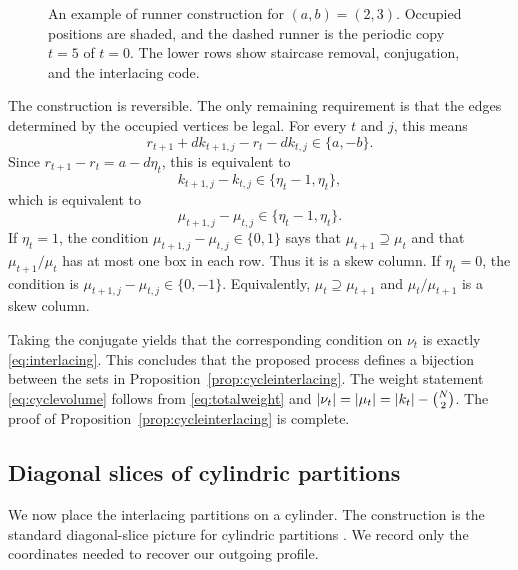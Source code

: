 \documentclass[12pt,reqno]{amsart}
\numberwithin{equation}{section}
\theoremstyle{definition}
\theoremstyle{remark}
\theoremstyle{plain}
\DeclarePairedDelimiter\abs{\lvert}{\rvert}
\begin{document}
\begin{figure}[!htbp]
\caption{An example of runner construction for $(a,b)=(2,3)$. Occupied positions are shaded, and the dashed runner is the periodic copy $t=5$ of $t=0$.  The lower rows show staircase removal, conjugation, and the interlacing code. }
\label{fig:residuerunners}
\end{figure}


The construction is reversible. The only remaining requirement is that the edges determined by the occupied vertices be legal. For every $t$ and $j$, this means
\[r_{t+1}+dk_{t+1,j}-r_t-dk_{t,j} \in \{a,-b\}.\]
Since $r_{t+1}-r_t=a-d\eta_t$, this is equivalent to
\begin{equation}\label{eq:runnerdiff}
 k_{t+1,j}-k_{t,j}\in\{\eta_t-1,\eta_t\},
\end{equation}
which is equivalent to
\[ \mu_{t+1,j}-\mu_{t,j}\in \{\eta_t-1,\eta_t\}.\]
If $\eta_t=1$, the condition $\mu_{t+1,j}-\mu_{t,j}\in\{0,1\}$ says that $\mu_{t+1}\supseteq\mu_t$ and that $\mu_{t+1}/\mu_t$ has at most one box in each row. Thus it is a skew column. If $\eta_t=0$, the condition is $\mu_{t+1,j}-\mu_{t,j}\in\{0,-1\}$. Equivalently, $\mu_t\supseteq\mu_{t+1}$ and $\mu_t/\mu_{t+1}$ is a skew column.

Taking the conjugate yields that the corresponding condition on $\nu_t$ is exactly \eqref{eq:interlacing}. This concludes that the proposed process defines a bijection between the sets in Proposition~\ref{prop:cycleinterlacing}. The weight statement \eqref{eq:cyclevolume} follows from \eqref{eq:totalweight} and $\abs{\nu_t}=\abs{\mu_t}=\abs{k_t}-\binom N2$. The proof of Proposition~\ref{prop:cycleinterlacing} is complete.



\subsection{Diagonal slices of cylindric partitions}\label{subsec:diagonalmap}
We now place the interlacing partitions on a cylinder.  The construction is the standard diagonal-slice picture for cylindric partitions \cite[Section~5]{Borodin}.  We record only the coordinates needed to recover our outgoing profile.
\end{document}
